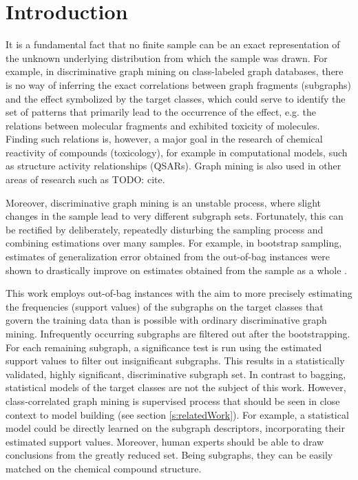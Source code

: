 \documentclass{article}
\begin{document}
\section{Introduction}
It is a fundamental fact that no finite sample can be an exact representation
of the unknown underlying distribution from which the sample was drawn.  For
example, in discriminative graph mining on class-labeled graph databases,
there is no way of inferring the exact correlations between graph fragments
(subgraphs) and the effect symbolized by the target classes, which could serve
to identify the set of patterns that primarily lead to the occurrence of the
effect, e.g. the relations between molecular fragments and exhibited toxicity
of molecules. Finding such relations is, however, a major goal in the research
of chemical reactivity of compounds (toxicology), for example in computational
models, such as structure activity relationships (QSARs). Graph mining is also
used in other areas of research such as TODO: cite.

Moreover, discriminative graph mining is an unstable process, where slight
changes in the sample lead to very different subgraph sets. Fortunately, this
can be rectified by deliberately, repeatedly disturbing the sampling process
and combining estimations over many samples. For example, in bootstrap
sampling, estimates of generalization error obtained from the out-of-bag
instances were shown to drastically improve on estimates obtained from the
sample as a whole \cite{bylander02estimating, breiman96oob}.  

This work employs out-of-bag instances with the aim to more precisely
estimating the frequencies (support values) of the subgraphs on the target
classes that govern the training data than is possible with ordinary
discriminative graph mining. Infrequently occurring subgraphs are filtered
out after the bootstrapping.  For each remaining subgraph, a significance test
is run using the estimated support values to filter out insignificant
subgraphs.  This results in a statistically validated, highly significant,
discriminative subgraph set.  In contrast to bagging, statistical models of the
target classes are not the subject of this work.  However, class-correlated
graph mining is supervised process that should be seen in close context to
model building (see section \ref{s:relatedWork}). For example, a statistical
model could be directly learned on the subgraph descriptors, incorporating
their estimated support values. Moreover, human experts should be able to draw
conclusions from the greatly reduced set. Being subgraphs, they can be easily
matched on the chemical compound structure.
\end{document}
